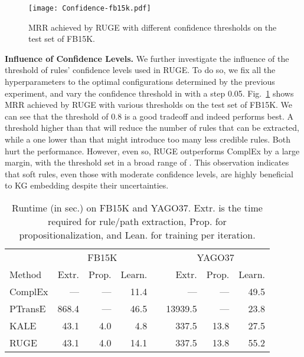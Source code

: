 \documentclass[letterpaper]{article} \usepackage{aaai18}  \usepackage{times}  \usepackage{helvet}  \usepackage{courier}  \usepackage{url}  \usepackage{graphicx}  \usepackage{amsmath}
\begin{document}
\begin{figure}[t]
    \centering
    \label{fig:Confidence-FB15K}
        \texttt{[image: Confidence-fb15k.pdf]}
  \caption{MRR achieved by RUGE with different confidence thresholds on the test set of FB15K.}\label{fig:Confidence}
\end{figure}

\smallskip
\noindent\textbf{Influence of Confidence Levels.} We further investigate the influence of the threshold of rules' confidence levels used in RUGE. To do so, we fix all the hyperparameters to the optimal configurations determined by the previous experiment, and vary the confidence threshold in  with a step 0.05. Fig.~\ref{fig:Confidence} shows MRR achieved by RUGE with various thresholds on the test set of FB15K. We can see that the threshold of 0.8 is a good tradeoff and indeed performs best. A threshold higher than that will reduce the number of rules that can be extracted, while a one lower than that might introduce too many less credible rules. Both hurt the performance. However, even so, RUGE outperforms ComplEx by a large margin, with the threshold set in a broad range of . This observation indicates that soft rules, even those with moderate confidence levels, are highly beneficial to KG embedding despite their uncertainties. 

\begin{table}[t]
    \centering\footnotesize\setlength{\tabcolsep}{2pt}
    \caption{\label{tab:Runtime} Runtime (in sec.) on FB15K and YAGO37. Extr. is the time required for rule/path extraction, Prop. for propositionalization, and Lean. for training per iteration.}
    \begin{tabular*}{0.47 \textwidth}{@{\extracolsep{\fill}}@{}lrrrrrrr@{}}
    \toprule
    & \multicolumn{3}{c}{FB15K} && \multicolumn{3}{c}{YAGO37} \\\cmidrule{2-4}\cmidrule{6-8}
    Method  & Extr. & Prop. & Learn. && Extr. & Prop. & Learn. \\
    \midrule
    ComplEx & ---   & --- & 11.4 && ---     & ---   & 49.5 \\
    PTransE & 868.4 & --- & 46.5 && 13939.5 & ---   & 23.8 \\
    KALE    & 43.1  & 4.0 & 4.8  && 337.5   & 13.8  & 27.5 \\
    RUGE    & 43.1  & 4.0 & 14.1 && 337.5   & 13.8  & 55.2 \\
    \bottomrule
    \end{tabular*}
\end{table}
\end{document}
